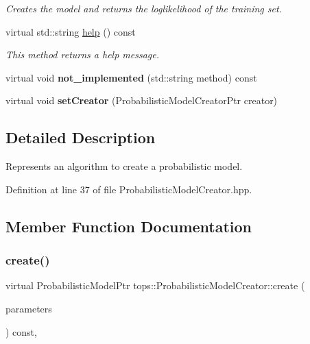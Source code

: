\begin{DoxyCompactItemize}
\begin{DoxyCompactList}\small\item\em Creates the model and returns the loglikelihood of the training set. \end{DoxyCompactList}\item 
\mbox{\label{classtops_1_1ProbabilisticModelCreator_a468486a1562442aadfc53bb55c62496b}} 
virtual std\+::string \hyperlink{classtops_1_1ProbabilisticModelCreator_a468486a1562442aadfc53bb55c62496b}{help} () const
\begin{DoxyCompactList}\small\item\em This method returns a help message. \end{DoxyCompactList}\item 
\mbox{\label{classtops_1_1ProbabilisticModelCreator_ac3a711019d9b50c4449e233dca9c4f9b}} 
virtual void {\bfseries not\+\_\+implemented} (std\+::string method) const
\item 
\mbox{\label{classtops_1_1ProbabilisticModelCreator_a8ada638f68782c6750ac40031c4c2bb0}} 
virtual void {\bfseries set\+Creator} (Probabilistic\+Model\+Creator\+Ptr creator)
\end{DoxyCompactItemize}


\subsection{Detailed Description}
Represents an algorithm to create a probabilistic model. 

Definition at line 37 of file Probabilistic\+Model\+Creator.\+hpp.



\subsection{Member Function Documentation}
\mbox{\label{classtops_1_1ProbabilisticModelCreator_afed6c8ffa45fff446bdaa8b533da8f7c}} 
\subsubsection{\texorpdfstring{create()}{create()}}
{\footnotesize\ttfamily virtual Probabilistic\+Model\+Ptr tops\+::\+Probabilistic\+Model\+Creator\+::create (\begin{DoxyParamCaption}\item[{\hyperlink{classtops_1_1ProbabilisticModelParameters}{Probabilistic\+Model\+Parameters} \&}]{parameters }\end{DoxyParamCaption}) const\hspace{0.3cm}{\ttfamily [inline]}, {\ttfamily [virtual]}}



